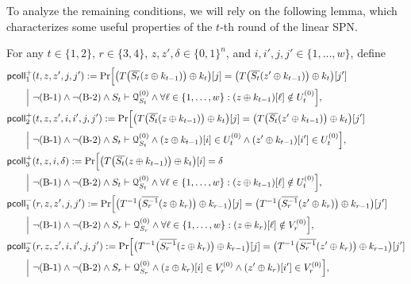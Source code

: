 To analyze the remaining conditions, we will rely on the following lemma, which characterizes some useful properties of the $t$-th round of the linear SPN.

\begin{lemma}
	\label{lemma:coll-prob}
	
	For any $t\in\{1,2\}$, $r\in\{3,4\}$, $z,z',\delta\in\{0,1\}^n$, and $i,i',j,j'\in\{1,\ldots,w\}$, define
	\begin{align*}
	&\pcoll_{1}^+(t,z,z',j,j')  :={\Pr}\Big[\big(T\big(\overline{S_t}(z\xor k_{t-1})\big)\xor k_t\big)[j]=\big(T\big(\overline{S_t}(z'\xor k_{t-1})\big)\xor k_t\big)[j']       \\
	&\midindent~\Big|~\neg\bone\wedge\neg\btwo\wedge S_t\vdash\mathcal{Q}_{S_t}^{(0)}\wedge\forall\ell\in\{1,\ldots,w\}:(z\xor k_{t-1})[\ell]\notin U_t^{(0)}\Big],         \\
	&\pcoll_{2}^+(t,z,z',i,i',j,j')      :={\Pr}\Big[\big(T\big(\overline{S_t}(z\xor k_{t-1})\big)\xor k_t\big)[j]=\big(T\big(\overline{S_t}(z'\xor k_{t-1})\big)\xor k_t\big)[j']   \\
	&\midindent~\Big|~\neg\bone\wedge\neg\btwo\wedge S_t\vdash\mathcal{Q}_{S_t}^{(0)}\wedge(z\xor k_{t-1})[i]\in U_t^{(0)}\wedge(z'\xor k_{t-1})[i']\in U_t^{(0)}\Big],         \\
	&\pcoll_{3}^+(t,z,i,\delta)      :={\Pr}\Big[\big(T\big(\overline{S_t}(z\xor k_{t-1})\big)\xor k_t\big)[i]=\delta    \\
	&\midindent~\Big|~\neg\bone\wedge\neg\btwo\wedge S_t\vdash\mathcal{Q}_{S_t}^{(0)}\wedge\forall\ell\in\{1,\ldots,w\}:(z\xor k_{t-1})[\ell]\notin U_t^{(0)}\Big],         \\
	&\pcoll_{1}^-(r,z,z',j,j')     :={\Pr}\Big[\big(T^{-1}\big(\overline{S_r^{-1}}(z\xor k_r)\big)\xor k_{r-1}\big)[j]=\big(T^{-1}\big(\overline{S_r^{-1}}(z'\xor k_r)\big)\xor k_{r-1}\big)[j']    \\
	&\midindent~\Big|~\neg\bone\wedge\neg\btwo\wedge S_r\vdash\mathcal{Q}_{S_r}^{(0)}\wedge\forall\ell\in\{1,\ldots,w\}:(z\xor k_r)[\ell]\notin V_r^{(0)}\Big],         \\
	&\pcoll_{2}^-(r,z,z',i,i',j,j')    :={\Pr}\Big[\big(T^{-1}\big(\overline{S_r^{-1}}(z\xor k_r)\big)\xor k_{r-1}\big)[j]=\big(T^{-1}\big(\overline{S_r^{-1}}(z'\xor k_r)\big)\xor k_{r-1}\big)[j']     \\
	&\midindent~\Big|~\neg\bone\wedge\neg\btwo\wedge S_r\vdash\mathcal{Q}_{S_r}^{(0)}\wedge(z\xor k_r)[i]\in V_r^{(0)}\wedge(z'\xor k_r)[i']\in V_r^{(0)}\Big],         \\

\end{align*}
\end{lemma}

